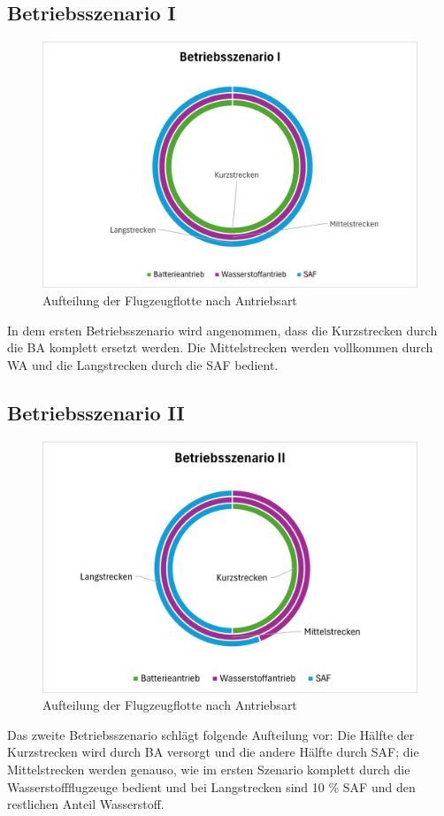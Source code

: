 \subsection{Betriebsszenario I}
\begin{figure}[h]
	\centering
	\includegraphics[width=0.8\linewidth]{Bilder/BetriebsszenarioI.png}
	\caption[Betriebsszenario I]{Aufteilung der Flugzeugflotte nach Antriebsart}
	\label{betriebsszenario1}
\end{figure}

In dem ersten Betriebsszenario wird angenommen, dass die Kurzstrecken durch die BA komplett ersetzt werden.
Die Mittelstrecken werden vollkommen durch WA und die Langstrecken durch die SAF bedient.

\subsection{Betriebsszenario II}
\begin{figure}[h]
	\centering
	\includegraphics[width=0.8\linewidth]{Bilder/BetriebsszenarioII.png}
	\caption[Betriebsszenario II]{Aufteilung der Flugzeugflotte nach Antriebsart}
	\label{betriebsszenario2}
\end{figure}
Das zweite Betriebsszenario schlägt folgende Aufteilung vor: Die Hälfte der Kurzstrecken wird durch BA versorgt und die andere Hälfte
durch SAF; die Mittelstrecken werden genauso, wie im ersten Szenario komplett durch die Wasserstoffflugzeuge bedient und bei Langstrecken
sind 10 \% SAF und den restlichen Anteil Wasserstoff.

